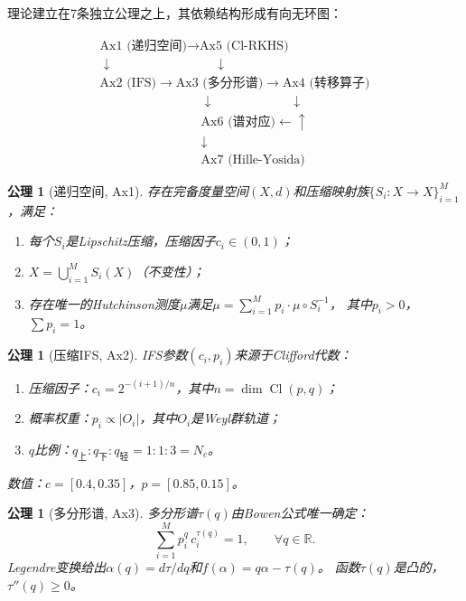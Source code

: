 \documentclass[12pt,a4paper]{ctexart}
\newtheorem{axiom}[theorem]{公理}
\newcommand{\R}{\mathbb{R}}
\newcommand{\Cl}{\operatorname{Cl}}
\begin{document}
理论建立在7条独立公理之上，其依赖结构形成有向无环图：

\[
\begin{array}{c}
\text{Ax1 (递归空间)} \longrightarrow \text{Ax5 (Cl-RKHS)} \\
\downarrow \qquad\qquad\qquad\qquad \downarrow \\
\text{Ax2 (IFS)} \longrightarrow \text{Ax3 (多分形谱)} \longrightarrow \text{Ax4 (转移算子)} \\
\qquad\qquad\qquad\qquad \downarrow \qquad\qquad\qquad \downarrow \\
\qquad\qquad\qquad\qquad \text{Ax6 (谱对应)} \longleftarrow\!\!\!\!\!\!\uparrow \\
\qquad\qquad\qquad\qquad \downarrow \\
\qquad\qquad\qquad\qquad \text{Ax7 (Hille-Yosida)}
\end{array}
\]

\begin{axiom}[递归空间, Ax1]
存在完备度量空间$(X,d)$和压缩映射族$\{S_i: X \to X\}_{i=1}^M$，满足：
\begin{enumerate}
  \item 每个$S_i$是Lipschitz压缩，压缩因子$c_i \in (0,1)$；
  \item $X = \bigcup_{i=1}^M S_i(X)$（不变性）；
  \item 存在唯一的Hutchinson测度$\mu$满足$\mu = \sum_{i=1}^M p_i \cdot \mu \circ S_i^{-1}$，
  其中$p_i > 0$，$\sum p_i = 1$。
\end{enumerate}
\end{axiom}

\begin{axiom}[压缩IFS, Ax2]
IFS参数$(c_i, p_i)$来源于Clifford代数：
\begin{enumerate}
  \item 压缩因子：$c_i = 2^{-(i+1)/n}$，其中$n = \dim \Cl(p,q)$；
  \item 概率权重：$p_i \propto |O_i|$，其中$O_i$是Weyl群轨道；
  \item $q$比例：$q_{\text{上}}:q_{\text{下}}:q_{\text{轻}} = 1:1:3 = N_c$。
\end{enumerate}
数值：$c = [0.4, 0.35]$，$p = [0.85, 0.15]$。
\end{axiom}

\begin{axiom}[多分形谱, Ax3]
多分形谱$\tau(q)$由Bowen公式唯一确定：
\begin{equation}
\sum_{i=1}^M p_i^q \, c_i^{\tau(q)} = 1, \qquad \forall q \in \R.
\label{eq:bowen}
\end{equation}
Legendre变换给出$\alpha(q) = d\tau/dq$和$f(\alpha) = q\alpha - \tau(q)$。
函数$\tau(q)$是凸的，$\tau''(q) \ge 0$。
\end{axiom}
\end{document}
